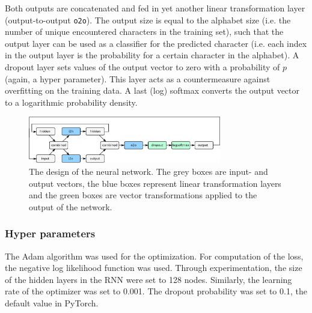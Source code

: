 Both outputs are concatenated and fed in yet another linear transformation layer (output-to-output {\tt o2o}).
The output size is equal to the alphabet size (i.e. the number of unique encountered characters in the training set), such that the output layer can be used as a classifier for the predicted character (i.e. each index in the output layer is the probability for a certain character in the alphabet).
A dropout layer sets values of the output vector to zero with a probability of $p$ (again, a hyper parameter).
This layer acts as a countermeasure against overfitting on the training data.
A last (log) softmax converts the output vector to a logarithmic probability density.

\begin{figure}[t]
	\centering
	\includegraphics[width=0.75\textwidth]{figures/rnn.eps} 
	\caption{The design of the neural network. The grey boxes are input- and output vectors, the blue boxes represent linear transformation layers and the green boxes are vector transformations
	 applied to the output of the network.}
	\label{fig:rnn}
\end{figure}

\subsubsection{Hyper parameters}
The Adam algorithm was used for the optimization.
For computation of the loss, the negative log likelihood function was used. 
Through experimentation, the size of the hidden layers in the RNN were set to 128 nodes.
Similarly, the learning rate of the optimizer was set to 0.001.
The dropout probability was set to 0.1, the default value in PyTorch.